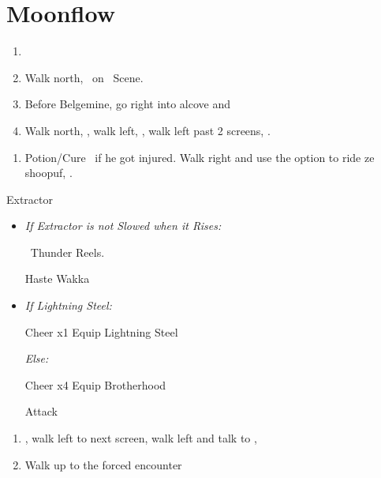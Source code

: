 \chapter{Moonflow}

\begin{enumerate}
    \item \formation{\tidus}{\kimahri}{\auron}
    \item Walk north, \sd\ on \kimahri\ Scene.
    \item Before Belgemine, go right into alcove and 
    \item Walk north, \sd, walk left, \sd, walk left past 2 screens, \sd.
\end{enumerate}
\begin{enumerate}[resume]
    \item Potion/Cure \tidus\ if he got injured. Walk right and use the  option to ride ze shoopuf, \sd.
\end{enumerate}
\begin{battle}[4000]{Extractor}
    \begin{itemize}
        \tidusf Haste self
        \wakkaf If anyone is below 216 HP Hi-Potion them, otherwise Attack
        \tidusf Attack Extractor until you apply Slow
        \item \textit{If Extractor is not Slowed when it Rises:}
        \begin{itemize}
            \wakkaf \od\ Thunder Reels.
        \end{itemize}
        \tidusf Haste Wakka
        \item \textit{If Lightning Steel:}
        \begin{itemize}
            \tidusf Cheer x1
            \tidusf Equip Lightning Steel
        \end{itemize}
        \textit{Else:}
        \begin{itemize}
            \tidusf Cheer x4
            \tidusf Equip Brotherhood
        \end{itemize}
        \tidusf Attack
    \end{itemize}
\end{battle}
\begin{enumerate}[resume]
    \item \sd, walk left to next screen, walk left and talk to \rikku, \sd
    \item Walk up to the forced encounter
\end{enumerate}
